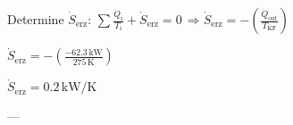 Determine \( \dot{S}_{\text{erz}} \):  
\( \sum \frac{\dot{Q}_i}{T_i} + \dot{S}_{\text{erz}} = 0 \, \Rightarrow \dot{S}_{\text{erz}} = -\left( \frac{\dot{Q}_{\text{out}}}{T_{\text{KF}}} \right) \)  

\( \dot{S}_{\text{erz}} = -\left( \frac{-62.3 \, \text{kW}}{275 \, \text{K}} \right) \)  

\( \dot{S}_{\text{erz}} = 0.2 \, \text{kW/K} \)  

---